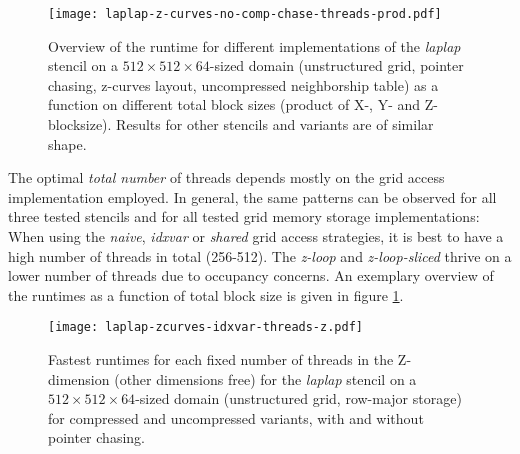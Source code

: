 \begin{figure}
    \texttt{[image: laplap-z-curves-no-comp-chase-threads-prod.pdf]}
    \caption{\label{fig:blocksizes-overview} Overview of the runtime for different implementations of the \emph{laplap} stencil on a $512\times 512\times 64$-sized domain (unstructured grid, pointer chasing, z-curves layout, uncompressed neighborship table) as a function on different total block sizes (product of X-, Y- and Z-blocksize). Results for other stencils and variants are of similar shape.}
\end{figure}

The optimal \emph{total number} of threads depends mostly on the grid access implementation employed. In general, the same patterns can be observed for all three tested stencils and for all tested grid memory storage implementations: When using the \emph{naive}, \emph{idxvar} or \emph{shared} grid access strategies, it is best to have a high number of threads in total (256-512). The \emph{z-loop} and \emph{z-loop-sliced} thrive on a lower number of threads due to occupancy concerns. An exemplary overview of the runtimes as a function of total block size is given in figure \ref{fig:blocksizes-overview}.

\begin{figure}
    \texttt{[image: laplap-zcurves-idxvar-threads-z.pdf]} %
    \caption{\label{fig:blocksizes-z}Fastest runtimes for each fixed number of threads in the Z-dimension (other dimensions free) for the \emph{laplap} stencil on a $512\times 512\times 64$-sized domain (unstructured grid, row-major storage) for compressed and uncompressed variants, with and without pointer chasing.}
\end{figure}

